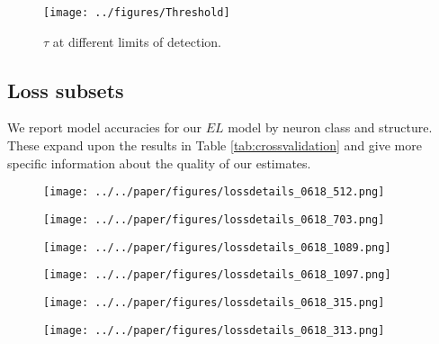 \begin{figure}[H]
    \centering
    \texttt{[image: ../figures/Threshold]}
    \label{fig:threshold}
    \caption{$\tau$ at different limits of detection.}
\end{figure}

\newpage

\subsection{Loss subsets}
\label{supp_sec:loss_subsets}

We report model accuracies for our $EL$ model by neuron class and structure.
These expand upon the results in Table \ref{tab:crossvalidation} and give more specific information about the quality of our estimates. 

\begin{figure}[H]
    \centering
    \texttt{[image: ../../paper/figures/lossdetails\_0618\_512.png]} 
    \label{fig:distances}
    \caption{}
\end{figure}

\begin{figure}[H]
    \centering
    \texttt{[image: ../../paper/figures/lossdetails\_0618\_703.png]} 
    \label{fig:distances}
    \caption{}
\end{figure}

\begin{figure}[H]
    \centering
    \texttt{[image: ../../paper/figures/lossdetails\_0618\_1089.png]} 
    \label{fig:distances}
    \caption{}
\end{figure}

\begin{figure}[H]
    \centering
    \texttt{[image: ../../paper/figures/lossdetails\_0618\_1097.png]} 
    \label{fig:distances}
    \caption{}
\end{figure}

\begin{figure}[H]
    \centering
    \texttt{[image: ../../paper/figures/lossdetails\_0618\_315.png]} 
    \label{fig:distances}
    \caption{}
\end{figure}

\begin{figure}[H]
    \centering
    \texttt{[image: ../../paper/figures/lossdetails\_0618\_313.png]} 
    \label{fig:distances}
    \caption{}
\end{figure}

